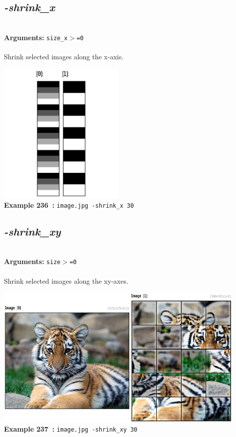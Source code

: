 \documentclass[a4paper,11pt,twoside]{book}
\begin{document}
\subsection{\emph{-shrink\_x} }\vspace*{-0.5em}
~\\\textbf{Arguments: } 
{\small \texttt{size\_x$>$=0}}\\~\\
Shrink selected images along the x-axis.
\begin{center}\includegraphics[keepaspectratio=true,height=7cm,width=\textwidth]{img/gmic_def236.jpg}\\
{\footnotesize \textbf{Example 236~:} \texttt{image.jpg -shrink\_x 30}}
\end{center}

\subsection{\emph{-shrink\_xy} }\vspace*{-0.5em}
~\\\textbf{Arguments: } 
{\small \texttt{size$>$=0}}\\~\\
Shrink selected images along the xy-axes.
\begin{center}\includegraphics[keepaspectratio=true,height=7cm,width=\textwidth]{img/gmic_def237.jpg}\\
{\footnotesize \textbf{Example 237~:} \texttt{image.jpg -shrink\_xy 30}}
\end{center}
\end{document}
